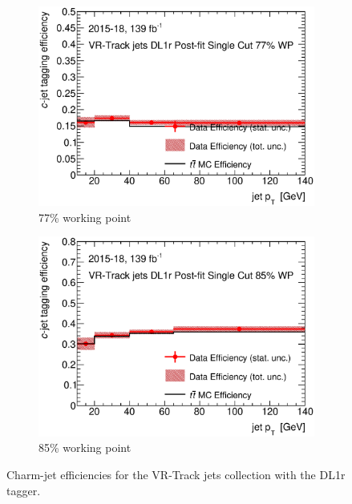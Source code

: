 \documentclass[letterpaper,12pt]{article}
\begin{document}
\begin{figure}[H]
\begin{subfigure}[t]{.35\linewidth}
			\includegraphics[width=1\textwidth]{FTAG_plots/DL1rallVRJetsDec/eff77.eps}
			\caption{77\% working point}
			\end{subfigure}
			\begin{subfigure}[t]{.35\linewidth}
			\includegraphics[width=1\textwidth]{FTAG_plots/DL1rallVRJetsDec/eff85.eps}
			\caption{85\% working point}
			\end{subfigure}
		\caption{Charm-jet efficiencies for the VR-Track jets collection with
		the DL1r tagger.} \label{fig:Dec_eff_VRJets_DL1r}
\end{figure}
\end{document}
